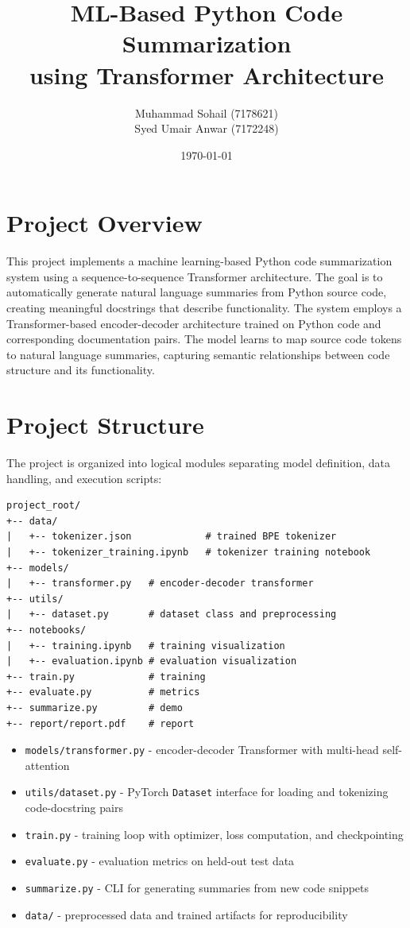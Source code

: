 \documentclass[11pt]{article}
\title{ML-Based Python Code Summarization\\using Transformer Architecture}
\author{Muhammad Sohail (7178621) \\ Syed Umair Anwar (7172248)}
\date{\today}
\begin{document}
\maketitle
\thispagestyle{empty}
\newpage

\tableofcontents
\newpage

\section{Project Overview}

This project implements a machine learning-based Python code summarization system using a sequence-to-sequence Transformer architecture. The goal is to automatically generate natural language summaries from Python source code, creating meaningful docstrings that describe functionality. The system employs a Transformer-based encoder-decoder architecture trained on Python code and corresponding documentation pairs. The model learns to map source code tokens to natural language summaries, capturing semantic relationships between code structure and its functionality.

\section{Project Structure}

The project is organized into logical modules separating model definition, data handling, and execution scripts:

\begin{lstlisting}[style=plain]
project_root/
+-- data/
|   +-- tokenizer.json             # trained BPE tokenizer
|   +-- tokenizer_training.ipynb   # tokenizer training notebook
+-- models/
|   +-- transformer.py   # encoder-decoder transformer
+-- utils/
|   +-- dataset.py       # dataset class and preprocessing
+-- notebooks/
|   +-- training.ipynb   # training visualization
|   +-- evaluation.ipynb # evaluation visualization
+-- train.py             # training
+-- evaluate.py          # metrics
+-- summarize.py         # demo
+-- report/report.pdf    # report
\end{lstlisting}

\begin{itemize}
\item \texttt{models/transformer.py} - encoder-decoder Transformer with multi-head self-attention
\item \texttt{utils/dataset.py} - PyTorch \texttt{Dataset} interface for loading and tokenizing code-docstring pairs
\item \texttt{train.py} - training loop with optimizer, loss computation, and checkpointing
\item \texttt{evaluate.py} - evaluation metrics on held-out test data
\item \texttt{summarize.py} - CLI for generating summaries from new code snippets
\item \texttt{data/} - preprocessed data and trained artifacts for reproducibility
\end{itemize}
\end{document}
